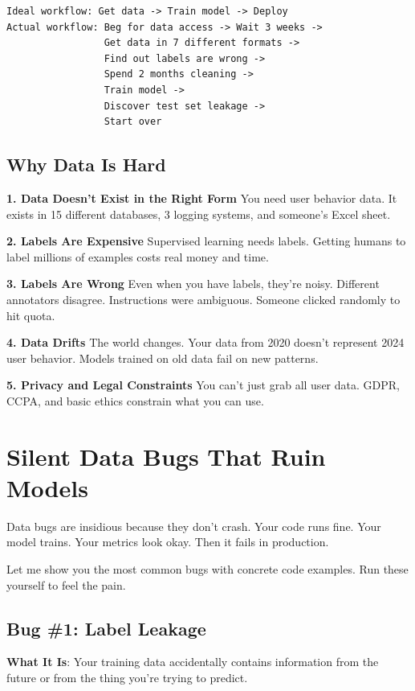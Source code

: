 \documentclass[11pt,oneside]{book}
\begin{document}
\begin{lstlisting}
Ideal workflow: Get data -> Train model -> Deploy
Actual workflow: Beg for data access -> Wait 3 weeks ->
                 Get data in 7 different formats ->
                 Find out labels are wrong ->
                 Spend 2 months cleaning ->
                 Train model ->
                 Discover test set leakage ->
                 Start over
\end{lstlisting}

\subsection{Why Data Is Hard}

\textbf{1. Data Doesn't Exist in the Right Form}
You need user behavior data. It exists in 15 different databases, 3 logging systems, and someone's Excel sheet.

\textbf{2. Labels Are Expensive}
Supervised learning needs labels. Getting humans to label millions of examples costs real money and time.

\textbf{3. Labels Are Wrong}
Even when you have labels, they're noisy. Different annotators disagree. Instructions were ambiguous. Someone clicked randomly to hit quota.

\textbf{4. Data Drifts}
The world changes. Your data from 2020 doesn't represent 2024 user behavior. Models trained on old data fail on new patterns.

\textbf{5. Privacy and Legal Constraints}
You can't just grab all user data. GDPR, CCPA, and basic ethics constrain what you can use.

\section{Silent Data Bugs That Ruin Models}

Data bugs are insidious because they don't crash. Your code runs fine. Your model trains. Your metrics look okay. Then it fails in production.

Let me show you the most common bugs with concrete code examples. Run these yourself to feel the pain.

\subsection{Bug \#1: Label Leakage}

\textbf{What It Is}: Your training data accidentally contains information from the future or from the thing you're trying to predict.
\end{document}
